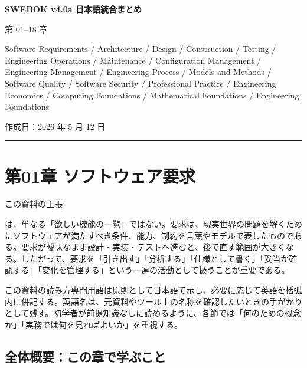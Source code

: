 \documentclass[a4paper,11pt]{ltjsarticle}
\numberwithin{figure}{section}
\numberwithin{table}{section}
\newcommand{\MiniBox}[2]{\par\smallskip\begin{statementbox}{#1}#2\end{statementbox}\par\smallskip}
\begin{document}
\thispagestyle{empty}

\begin{center}

{\LARGE\bfseries SWEBOK v4.0a 日本語統合まとめ}\par\vspace{1em}

{\Large 第 01--18 章}\par\vspace{0.8em}

{\large Software Requirements / Architecture / Design / Construction / Testing / Engineering Operations / Maintenance / Configuration Management / Engineering Management / Engineering Process / Models and Methods / Software Quality / Software Security / Professional Practice / Engineering Economics / Computing Foundations / Mathematical Foundations / Engineering Foundations}\par\vspace{1em}

{作成日：2026 年 5 月 12 日}\par

\end{center}

\vspace{1em}\hrule\vspace{0.8em}

\tableofcontents

\clearpage

\section{第01章 ソフトウェア要求}
\noindent この資料の主張

は、単なる「欲しい機能の一覧」ではない。要求は、現実世界の問題を解くためにソフトウェアが満たすべき条件、能力、制約を言葉やモデルで表したものである。要求が曖昧なまま設計・実装・テストへ進むと、後で直す範囲が大きくなる。したがって、要求を「引き出す」「分析する」「仕様として書く」「妥当か確認する」「変化を管理する」という一連の活動として扱うことが重要である。

\MiniBox{この資料の読み方}{専門用語は原則として日本語で示し、必要に応じて英語を括弧内に併記する。英語名は、元資料やツール上の名称を確認したいときの手がかりとして残す。初学者が前提知識なしに読めるように、各節では「何のための概念か」「実務では何を見ればよいか」を重視する。}



\subsection*{全体概要：この章で学ぶこと}
\end{document}
